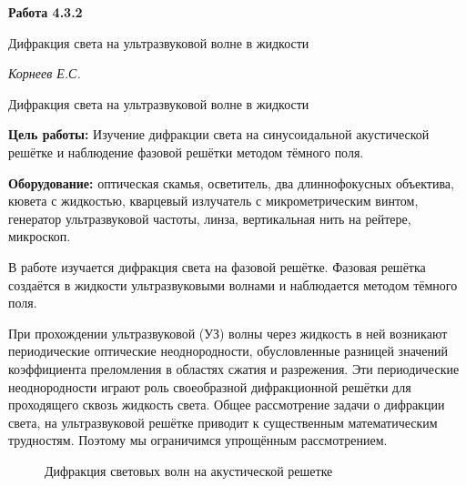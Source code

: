 \documentclass[14pt]{article}
\begin{document}
\begin{titlepage}
	\begin{center}
		\fontsize{18pt}{20pt}\selectfont
		\textbf{Работа 4.3.2}	
	
		\vspace{5cm}
		\fontsize{24pt}{25pt}\selectfont
		Дифракция света на ультразвуковой волне в жидкости
	\end{center}
	\begin{flushright}
		\fontsize{18pt}{20pt}\selectfont
		\vspace{14cm}
		\hspace{-3cm}
		\textit{Корнеев Е.С.}
	\end{flushright}		
\end{titlepage}

\begin{center}
	\fontsize{16pt}{18pt}\selectfont
	Дифракция света на ультразвуковой волне в жидкости
\end{center}


\fontsize{14pt}{16pt}\selectfont
\vspace{1cm}
\textbf{Цель работы:} Изучение дифракции света на синусоидальной акустической решётке и наблюдение фазовой решётки методом тёмного поля.

\vspace{0.5cm}
\textbf{Оборудование:} оптическая скамья, осветитель, два длиннофокусных объектива, кювета с жидкостью, кварцевый излучатель с микрометрическим винтом, генератор ультразвуковой частоты, линза, вертикальная нить на рейтере, микроскоп. 

В работе изучается дифракция света на фазовой решётке. Фазовая решётка создаётся в жидкости ультразвуковыми волнами и наблюдается методом тёмного поля.

При прохождении ультразвуковой (УЗ) волны через жидкость в ней возникают периодические оптические неоднородности, обусловленные разницей значений коэффициента преломления в областях сжатия и разрежения. Эти периодические неоднородности играют роль своеобразной дифракционной решётки для проходящего сквозь жидкость света. Общее рассмотрение задачи о дифракции света, на ультразвуковой решётке приводит к существенным математическим трудностям. Поэтому мы ограничимся упрощённым рассмотрением.

\begin{figure}[h!]
	\caption{Дифракция световых волн на акустической решетке}
	\label{fig:image}
\end{figure}
\end{document}
